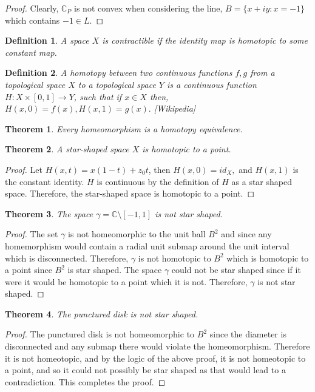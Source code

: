 \documentclass[letter]{article}
\newtheorem{theorem}{Theorem}
\newtheorem{definition}{Definition}
\newenvironment{menumerate}{%
  \edef\backupindent{\the\parindent}%
  \enumerate%
  \setlength{\parindent}{\backupindent}%
}{\endenumerate}
\begin{document}
\begin{menumerate}
\begin{proof}
		Clearly, $\mathbb{C}_P$ is not convex when considering the line, $B = \{x + iy : x = -1\}$ which contains $-1 \in L.$
 	\end{proof}
 	\begin{definition}
 		A space $X$ is contractible if the identity map is homotopic to some constant map.
 	\end{definition}
 	\begin{definition}
 		A homotopy between two continuous functions $f,g$ from a topological space $X$ to a topological space $Y$ is a continuous function $H: X \times [0,1] \to Y$, such that if $x \in X$ then,
 		$H(x,0) = f(x), H(x,1) = g(x).$ [Wikipedia]
 	\end{definition}
 	\begin{theorem}
 		Every homeomorphism is a homotopy equivalence.
 	\end{theorem}
 	\begin{theorem}
 		A star-shaped space $X$ is homotopic to a point.
 	\end{theorem}
 	\begin{proof}
 		Let $H(x,t) = x(1-t)+z_0t$, then $H(x,0) = id_X,$ and $H(x,1)$ is the constant identity. $H$ is continuous by the definition of $H$ as a star shaped space. Therefore, the star-shaped space is homotopic to a point.
 	\end{proof}
 	\begin{theorem}
 		The space $\gamma = \mathbb{C}\setminus[-1,1]$ is not star shaped.
 	\end{theorem}
 	\begin{proof}
 		The set $\gamma$ is not homeomorphic to the unit ball $B^2$ and since any homemorphism would contain a radial unit submap around the unit interval
 		which is disconnected. Therefore, $\gamma$ is not homotopic to
 		$B^2$ which is homotopic to a point since $B^2$ is star shaped.
 		The space $\gamma$ could not be star shaped since if it were it would be homotopic to a point which it is not. Therefore, $\gamma$
 		is not star shaped. 
 	\end{proof}
 	\begin{theorem}
 		The punctured disk is not star shaped.
 	\end{theorem}
 	\begin{proof}
 		The punctured disk is not homeomorphic to $B^2$ since the diameter
 		is disconnected and any submap there would violate the homeomorphism. Therefore it is not homeotopic, and by the logic of
 		the above proof, it is not homeotopic to a point, and so it could not possibly be star shaped as that would lead to a contradiction. This completes the proof.
 	\end{proof}
 	\item 
\end{menumerate}
\end{document}

